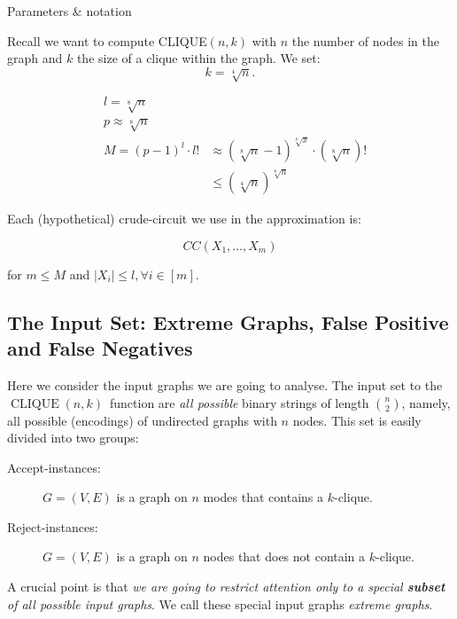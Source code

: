 \begin{trailer}{Parameters \& notation}

Recall we want to compute CLIQUE$(n, k)$
with $n$ the number of nodes in the graph and $k$ the size of a clique within the graph. 
We set:
$$
k=\sqrt[4]{n}.
$$


$$
\begin{aligned}
& l=\sqrt[8]{n} \\
& p \approx \sqrt[8]{n} \\
& M=(p-1)^l \cdot l! & \approx(\sqrt[8]{n}-1)^{\sqrt[8]{x}} \cdot(\sqrt[8]{n})! \\
& & \leq(\sqrt[4]{n})^{\sqrt[8]{n}}
\end{aligned}
$$


Each (hypothetical) crude-circuit we use in the approximation is:

$$
C C\left(X_1, \ldots, X_m\right)
$$

for $m \leq M$ and $\left|X_i\right| \leq l, \forall i \in[m]$.
\end{trailer}

\newcommand{\cliquenk}{\ensuremath{\operatorname{CLIQUE}(n,k)}}

\subsection{The Input Set: Extreme Graphs, False Positive and False Negatives}

Here we consider the input graphs we are going to analyse. 
The input set to the \cliquenk\ function are \emph{all possible} binary strings of length $n\choose 2$, namely, all possible (encodings) of undirected graphs with $n$ nodes. This set is easily divided into two groups:

\begin{description}
\item[Accept-instances:] 
$G=(V, E)$ is a graph on $n$ modes that contains a $k$-clique.
\item[Reject-instances:]
$G=(V, E)$ is a graph on $n$ nodes that does not contain a $k$-clique.
\end{description}


 



A crucial point is that \emph{we are going to restrict attention only to a special \textbf{subset} of all possible input graphs}. We call these special input graphs \emph{extreme graphs}. 

